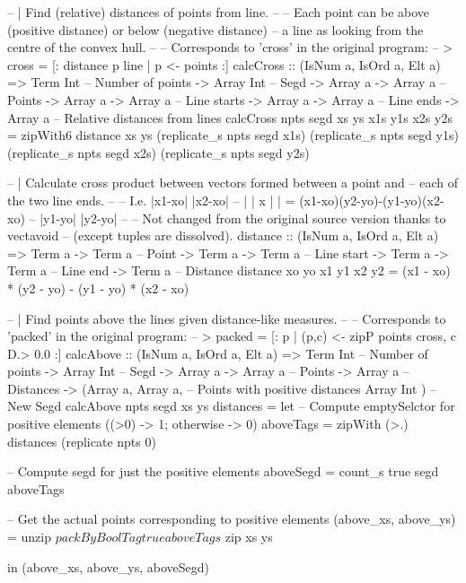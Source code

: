 \documentclass[preamble.tex]{subfiles}
\begin{document}
\begin{hscode}

-- | Find (relative) distances of points from line.
--
-- Each point can be above (positive distance) or below (negative distance)
-- a line as looking from the centre of the convex hull.
--
-- Corresponds to 'cross' in the original program:
-- > cross  = [: distance p line | p <- points :]
calcCross :: (IsNum a, IsOrd a, Elt a)
          => Term Int            -- Number of points
          -> Array Int           -- Segd
          -> Array a -> Array a  -- Points
          -> Array a -> Array a  -- Line starts
          -> Array a -> Array a  -- Line ends
          -> Array a             -- Relative distances from lines
calcCross npts segd xs ys x1s y1s x2s y2s
  = zipWith6 distance xs
                      ys
                      (replicate_s npts segd x1s)
                      (replicate_s npts segd y1s)
                      (replicate_s npts segd x2s)
                      (replicate_s npts segd y2s)



-- | Calculate cross product between vectors formed between a point and
--   each of the two line ends.
--
-- I.e. |x1-xo|   |x2-xo|
--      |     | x |     | = (x1-xo)(y2-yo)-(y1-yo)(x2-xo)
--      |y1-yo|   |y2-yo|
--
-- Not changed from the original source version thanks to vectavoid
-- (except tuples are dissolved).
distance :: (IsNum a, IsOrd a, Elt a)
         => Term a -> Term a  -- Point
         -> Term a -> Term a  -- Line start
         -> Term a -> Term a  -- Line end
         -> Term a            -- Distance
distance xo yo x1 y1 x2 y2
  = (x1 - xo) * (y2 - yo) - (y1 - yo) * (x2 - xo)

\end{hscode}

\begin{hscode}


-- | Find points above the lines given distance-like measures.
--
-- Corresponds to 'packed' in the original program:
-- > packed = [: p | (p,c) <- zipP points cross, c D.> 0.0 :]
calcAbove :: (IsNum a, IsOrd a, Elt a)
          => Term Int            -- Number of points
          -> Array Int           -- Segd
          -> Array a -> Array a  -- Points
          -> Array a             -- Distances
          -> (Array a, Array a,  -- Points with positive distances
              Array Int       )  -- New Segd
calcAbove npts segd xs ys distances
  = let -- Compute emptySelctor for positive elements ((>0) -> 1; otherwise -> 0)
        aboveTags  = zipWith (>.) distances (replicate npts 0)

        -- Compute segd for just the positive elements
        aboveSegd = count_s true segd aboveTags

        -- Get the actual points corresponding to positive elements
        (above_xs, above_ys)
                  = unzip
                  $ packByBoolTag true aboveTags
                  $ zip xs ys
 
    in  (above_xs, above_ys, aboveSegd)

\end{hscode}
\end{document}
